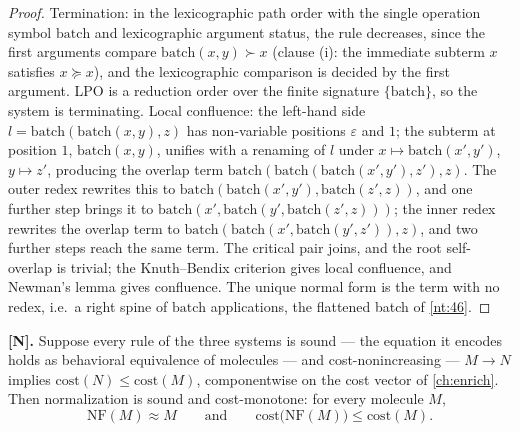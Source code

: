 \begin{proof}
Termination: in the lexicographic path order with the single operation
symbol $\mathrm{batch}$ and lexicographic argument status, the rule
decreases, since the first arguments compare
$\mathrm{batch}(x,y) \succ x$ (clause (i): the immediate subterm $x$
satisfies $x \succeq x$), and the lexicographic comparison is decided by the
first argument. LPO is a reduction order over the finite signature
$\{\mathrm{batch}\}$, so the system is terminating. Local confluence: the
left-hand side $l = \mathrm{batch}(\mathrm{batch}(x,y), z)$ has
non-variable positions $\varepsilon$ and $1$; the subterm at position $1$,
$\mathrm{batch}(x,y)$, unifies with a renaming of $l$ under
$x \mapsto \mathrm{batch}(x',y')$, $y \mapsto z'$, producing the overlap
term $\mathrm{batch}(\mathrm{batch}(\mathrm{batch}(x',y'),z'), z)$. The
outer redex rewrites this to $\mathrm{batch}(\mathrm{batch}(x',y'),
\mathrm{batch}(z',z))$, and one further step brings it to
$\mathrm{batch}(x', \mathrm{batch}(y', \mathrm{batch}(z',z)))$; the inner
redex rewrites the overlap term to
$\mathrm{batch}(\mathrm{batch}(x', \mathrm{batch}(y',z')), z)$, and two
further steps reach the same term. The critical pair joins, and the root
self-overlap is trivial; the Knuth--Bendix criterion gives local
confluence, and Newman's lemma gives confluence. The unique normal form is
the term with no redex, i.e.\ a right spine of $\mathrm{batch}$
applications, the flattened batch of \autoref{nt:46}.
\end{proof}

\begin{theorem}\label{nt:18}
\textbf{[N].} Suppose every rule of the three systems is sound --- the
equation it encodes holds as behavioral equivalence of molecules --- and
cost-nonincreasing --- $M \to N$ implies $\mathrm{cost}(N) \leq
\mathrm{cost}(M)$, componentwise on the cost vector of
\autoref{ch:enrich}. Then normalization is sound and cost-monotone: for
every molecule $M$,
\[
\mathrm{NF}(M) \approx M
\qquad\text{and}\qquad
\mathrm{cost}\bigl(\mathrm{NF}(M)\bigr) \leq \mathrm{cost}(M) .
\]
\end{theorem}

